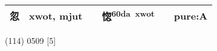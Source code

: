 \documentclass[14pt,a4paper]{scrartcl}
\begin{document}
\begin{longtable}[c]{@{}llllll@{}}
\begin{minipage}[t]{0.14\columnwidth}\raggedright\strut
忽
\strut\end{minipage} &
\begin{minipage}[t]{0.14\columnwidth}\raggedright\strut
xwot, mjut
\strut\end{minipage} &
\begin{minipage}[t]{0.14\columnwidth}\raggedright\strut
\strut\end{minipage} &
\begin{minipage}[t]{0.14\columnwidth}\raggedright\strut
惚\textsuperscript{60da~xwot}
\strut\end{minipage} &
\begin{minipage}[t]{0.14\columnwidth}\raggedright\strut
\strut\end{minipage} &
\begin{minipage}[t]{0.14\columnwidth}\raggedright\strut
pure:A
\strut\end{minipage}\tabularnewline
\bottomrule
\end{longtable}

(114) 0509 {[}5{]}
\end{document}
